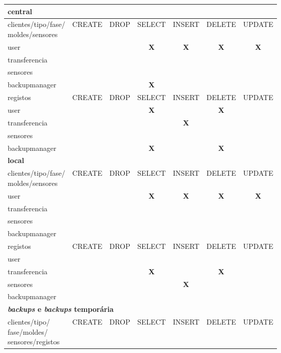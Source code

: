 \documentclass[11pt,twoside,a4paper]{report}
\begin{document}
\begin{table}
	\begin{tabular}{|l|c|c|c|c|c|c|}
		\multicolumn{7}{l}{\textbf{central}} \\ \hline
		\makecell{clientes/tipo/fase/\\moldes/sensores} & CREATE & DROP & SELECT & INSERT & DELETE & UPDATE \\ \hline
		user & & & \textbf{X} & \textbf{X} & \textbf{X} & \textbf{X} \\ \hline
		transferencia & & & & & & \\ \hline
		sensores & & & & & & \\ \hline
		backupmanager & & & \textbf{X} & & & \\ \hline
		registos & CREATE & DROP & SELECT & INSERT & DELETE & UPDATE \\ \hline
		user & & & \textbf{X} & & \textbf{X} & \\ \hline
		transferencia & & & & \textbf{X} & & \\ \hline
		sensores & & & & & & \\ \hline
		backupmanager & & & \textbf{X} & & \textbf{X} & \\ \hline
		\multicolumn{7}{l}{\textbf{local}} \\ \hline
		\makecell{clientes/tipo/fase/\\moldes/sensores} & CREATE & DROP & SELECT & INSERT & DELETE & UPDATE \\ \hline
		user & & & \textbf{X} & \textbf{X} & \textbf{X} & \textbf{X} \\ \hline
		transferencia & & & & & & \\ \hline
		sensores & & & & & & \\ \hline
		backupmanager & & & & & & \\ \hline
		registos & CREATE & DROP & SELECT & INSERT & DELETE & UPDATE \\ \hline
		user & & & & & & \\ \hline
		transferencia & & & \textbf{X} & & \textbf{X} & \\ \hline
		sensores & & & & \textbf{X} & & \\ \hline
		backupmanager & & & & & & \\ \hline
		\multicolumn{7}{l}{\textbf{\textit{backups} e \textit{backups} temporária}} \\ \hline
		\makecell{clientes/tipo/\\fase/moldes/\\sensores/registos} & CREATE & DROP & SELECT & INSERT & DELETE & UPDATE \\ \hline

\end{tabular}
\end{table}
\end{document}
